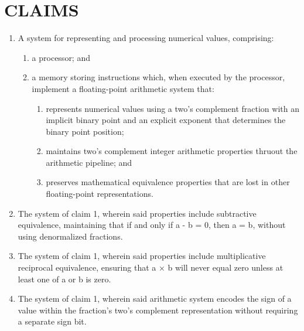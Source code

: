 \documentclass[12pt,letter]{article}
\begin{document}
\newcommand{\claim}[2]{
\stepcounter{claimcounter}
\textbf{Claim \arabic{claimcounter}.} #2\par
\vspace{0.5em}
}

\section*{CLAIMS}
\begin{enumerate}
    \item A system for representing and processing numerical values, comprising:
        \begin{enumerate}
            \item a processor; and
            \item a memory storing instructions which, when executed by the processor, implement a floating-point arithmetic system that:
                \begin{enumerate}
                    \item represents numerical values using a two's complement fraction with an implicit binary point and an explicit exponent that determines the binary point position;
                    \item maintains two's complement integer arithmetic properties thruout the arithmetic pipeline; and
                    \item preserves mathematical equivalence properties that are lost in other floating-point representations.
                \end{enumerate}
        \end{enumerate}
    
    \item The system of claim 1, wherein said properties include subtractive equivalence, maintaining that if and only if a - b = 0, then a = b, without using denormalized fractions.
    
    \item The system of claim 1, wherein said properties include multiplicative reciprocal equivalence, ensuring that a × b will never equal zero unless at least one of a or b is zero.
    
    \item The system of claim 1, wherein said arithmetic system encodes the sign of a value within the fraction's two's complement representation without requiring a separate sign bit.
    

\end{enumerate}
\end{document}
